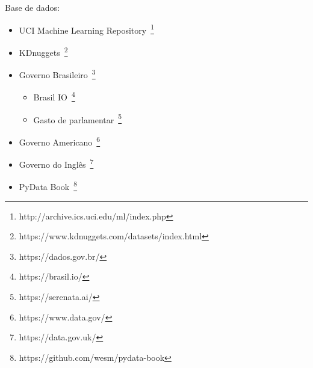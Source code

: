 Base de dados:
\begin{itemize}
	\item UCI Machine Learning Repository~\footnote{http://archive.ics.uci.edu/ml/index.php}
	\item KDnuggets~\footnote{https://www.kdnuggets.com/datasets/index.html}
	\item Governo Brasileiro~\footnote{https://dados.gov.br/}
	      \begin{itemize}
		      \item Brasil IO~\footnote{https://brasil.io/}
		      \item Gasto de parlamentar~\footnote{https://serenata.ai/}
	      \end{itemize}
	\item Governo Americano~\footnote{https://www.data.gov/}
	\item Governo do Inglês~\footnote{https://data.gov.uk/}
	\item PyData Book~\footnote{https://github.com/wesm/pydata-book}
\end{itemize}
